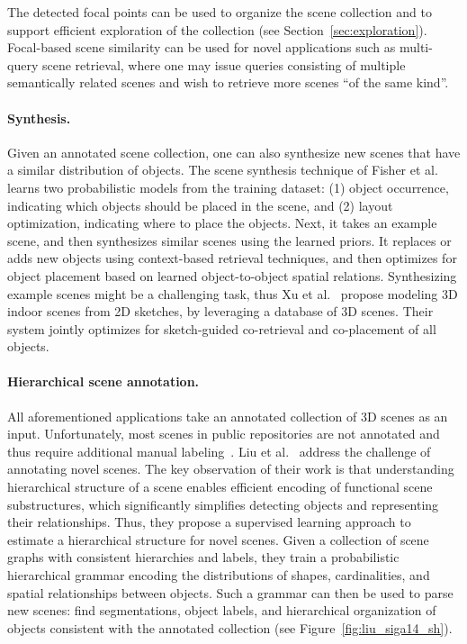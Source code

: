 

%
The detected focal points can be used to organize the scene collection and to support efficient exploration of the collection (see Section~\ref{sec:exploration}). Focal-based scene similarity can be used for novel applications such as multi-query scene retrieval,
where one may issue queries consisting of multiple semantically related scenes and wish to retrieve more scenes ``of the same kind''.%

%

\paragraph*{Synthesis.}
Given an annotated scene collection, one can also synthesize new scenes that have a similar distribution of objects. The scene synthesis technique of Fisher et al.~ learns two probabilistic models from the training dataset: (1) object occurrence, indicating which objects should be placed in the scene, and (2) layout optimization, indicating where to place the objects. Next, it takes an example scene, and then synthesizes similar scenes using the learned priors. It replaces or adds new objects using context-based retrieval techniques, and then optimizes for object placement based on learned object-to-object spatial relations.  Synthesizing example scenes might be a challenging task, thus Xu et al.~ propose modeling 3D indoor scenes from 2D sketches, by leveraging a database of 3D scenes. Their system jointly optimizes for sketch-guided co-retrieval and co-placement of all objects.



\paragraph*{Hierarchical scene annotation.}
All aforementioned applications take an annotated collection of 3D scenes as an input. Unfortunately, most scenes in public repositories are not annotated and thus require additional manual labeling~\cite{Fisher:2012:CSR}. Liu et al.~ address the challenge of annotating novel scenes. The key observation of their work is that understanding hierarchical structure of a scene enables efficient encoding of functional scene substructures, which significantly simplifies detecting objects and representing their relationships. Thus, they propose a supervised learning approach to estimate a hierarchical structure for novel scenes. Given a collection of scene graphs with consistent hierarchies and labels, they train a probabilistic hierarchical grammar encoding the distributions of shapes, cardinalities, and spatial relationships between objects. Such a grammar can then be used to parse new scenes: find segmentations, object labels, and hierarchical organization of objects consistent with the annotated collection (see Figure~\ref{fig:liu_siga14_sh}).

